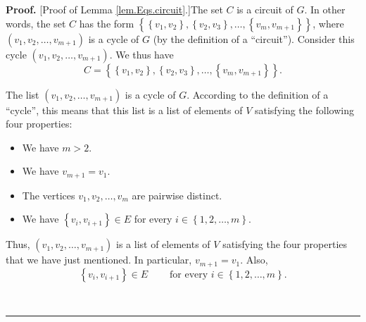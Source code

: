 \documentclass[numbers=enddot,12pt,final,onecolumn,notitlepage]{scrartcl}%
\theoremstyle{definition}
\newenvironment{proof}[1][Proof]{\noindent\textbf{#1.} }{\ \rule{0.5em}{0.5em}}
\newenvironment{verlong}{}{}
\begin{document}
\begin{verlong}
\begin{proof}
[Proof of Lemma \ref{lem.Eqs.circuit}.]The set $C$ is a circuit of $G$. In
other words, the set $C$ has the form $\left\{  \left\{  v_{1},v_{2}\right\}
,\left\{  v_{2},v_{3}\right\}  ,\ldots,\left\{  v_{m},v_{m+1}\right\}
\right\}  $, where $\left(  v_{1},v_{2},\ldots,v_{m+1}\right)  $ is a cycle of
$G$ (by the definition of a \textquotedblleft circuit\textquotedblright).
Consider this cycle $\left(  v_{1},v_{2},\ldots,v_{m+1}\right)  $. We thus
have
\begin{equation}
C=\left\{  \left\{  v_{1},v_{2}\right\}  ,\left\{  v_{2},v_{3}\right\}
,\ldots,\left\{  v_{m},v_{m+1}\right\}  \right\}  .
\label{pf.lem.Eqs.circuit.1}%
\end{equation}


The list $\left(  v_{1},v_{2},\ldots,v_{m+1}\right)  $ is a cycle of $G$.
According to the definition of a \textquotedblleft cycle\textquotedblright,
this means that this list is a list of elements of $V$ satisfying the
following four properties:

\begin{itemize}
\item We have $m>2$.

\item We have $v_{m+1}=v_{1}$.

\item The vertices $v_{1},v_{2},\ldots,v_{m}$ are pairwise distinct.

\item We have $\left\{  v_{i},v_{i+1}\right\}  \in E$ for every $i\in\left\{
1,2,\ldots,m\right\}  $.
\end{itemize}

Thus, $\left(  v_{1},v_{2},\ldots,v_{m+1}\right)  $ is a list of elements of
$V$ satisfying the four properties that we have just mentioned. In particular,
$v_{m+1}=v_{1}$. Also,%
\begin{equation}
\left\{  v_{i},v_{i+1}\right\}  \in E\ \ \ \ \ \ \ \ \ \ \text{for every }%
i\in\left\{  1,2,\ldots,m\right\}  . \label{pf.lem.Eqs.circuit.inE}%
\end{equation}



\end{proof}
\end{verlong}
\end{document}

